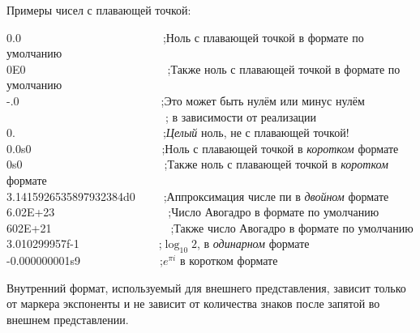 Примеры чисел с плавающей точкой:
\begin{lisp}
0.0~~~~~~~~~~~~~~~~~~~~~~~~~;\textrm{Ноль с плавающей точкой в формате по умолчанию} \\
0E0~~~~~~~~~~~~~~~~~~~~~~~~~;\textrm{Также ноль с плавающей точкой в формате по умолчанию} \\
-.0~~~~~~~~~~~~~~~~~~~~~~~~~;\textrm{Это может быть нулём или минус нулём} \\
~~~~~~~~~~~~~~~~~~~~~~~~~~~~; \textrm{в зависимости от реализации} \\
0.~~~~~~~~~~~~~~~~~~~~~~~~~~;\textrm{\emph{Целый} ноль, не с плавающей точкой!} \\
0.0s0~~~~~~~~~~~~~~~~~~~~~~~;\textrm{Ноль с плавающей точкой в \emph{коротком} формате} \\
0s0~~~~~~~~~~~~~~~~~~~~~~~~~;\textrm{Также ноль с плавающей точкой в \emph{коротком} формате} \\
3.1415926535897932384d0~~~~~;\textrm{Аппроксимация числе пи в \emph{двойном} формате} \\
6.02E+23~~~~~~~~~~~~~~~~~~~~;\textrm{Число Авогадро в формате по умолчанию} \\
602E+21~~~~~~~~~~~~~~~~~~~~~;\textrm{Также число Авогадро в формате по умолчанию} \\
3.010299957f-1~~~~~~~~~~~~~~;\textrm{$\log_{10} 2$, в \emph{одинарном} формате} \\
-0.000000001s9~~~~~~~~~~~~~~;\textrm{$e^{\pi i}$ в коротком формате}
\end{lisp}

Внутренний формат, используемый для внешнего представления, зависит только от
маркера экспоненты и не зависит от  количества знаков после запятой во внешнем
представлении. 

